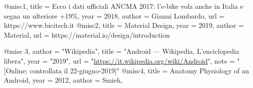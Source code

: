 @misc{1,
title = {Ecco i dati ufficiali ANCMA 2017: l’e-bike vola anche in Italia e segna un ulteriore +19\%},
year = {2018},
author = {Gianni Lombardo},
url = {https://www.bicitech.it}
}
@misc{2,
title = {Material Design},
year = {2019},
author = {Material},
url = {https://material.io/design/introduction}
}

@misc{ 3,
  author = "Wikipedia",
  title = "Android --- Wikipedia{,} L'enciclopedia libera",
  year = "2019",
  url = "\url{https://it.wikipedia.org/wiki/Android}",
  note = "[Online; controllata il 22-giugno-2019]"
}
@misc{4,
title = {Anatomy Physiology of an Android},
year = {2012},
author = {Smieh},
}